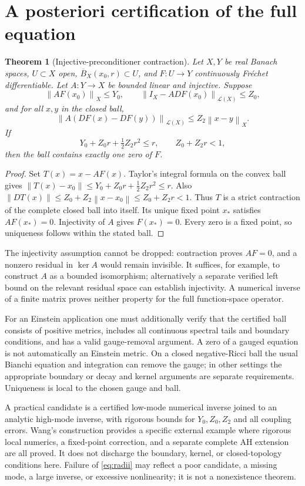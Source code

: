 \documentclass[a4paper,11pt]{article}
\newtheorem{theorem}{Theorem}[section]
\theoremstyle{definition}
\newcommand{\norm}[1]{\left\lVert#1\right\rVert}
\begin{document}
\section{A posteriori certification of the full equation}\label{sec:posteriori}
\begin{theorem}[Injective-preconditioner contraction]\label{thm:posteriori}
Let $X,Y$ be real Banach spaces, $U\subset X$ open,
$\overline B_X(x_0,r)\subset U$, and $F:U\to Y$ continuously
Fr\'echet differentiable. Let $A:Y\to X$ be bounded linear and
\emph{injective}. Suppose
\[
\norm{AF(x_0)}_X\le Y_0,\qquad
\norm{I_X-ADF(x_0)}_{\mathcal L(X)}\le Z_0,
\]
and for all $x,y$ in the closed ball,
\[
\norm{A(DF(x)-DF(y))}_{\mathcal L(X)}
                  \le Z_2\norm{x-y}_X .
\]
If
\begin{equation}\label{eq:radii}
Y_0+Z_0r+\tfrac12Z_2r^2\le r,\qquad Z_0+Z_2r<1,
\end{equation}
then the ball contains exactly one zero of $F$.
\end{theorem}
\begin{proof}
Set $T(x)=x-AF(x)$. Taylor's integral formula on the convex ball gives
$\norm{T(x)-x_0}\le Y_0+Z_0r+\frac12Z_2r^2\le r$.
Also
$\norm{DT(x)}\le Z_0+Z_2\norm{x-x_0}\le Z_0+Z_2r<1$.
Thus $T$ is a strict contraction of the complete closed ball into
itself. Its unique fixed point $x_*$ satisfies $AF(x_*)=0$.
Injectivity of $A$ gives $F(x_*)=0$. Every zero is a fixed point,
so uniqueness follows within the stated ball.
\end{proof}
The injectivity assumption cannot be dropped: contraction proves
$AF=0$, and a nonzero residual in $\ker A$ would remain invisible.
It suffices, for example, to construct $A$ as a bounded isomorphism;
alternatively a separate verified left bound on the relevant residual
space can establish injectivity. A numerical inverse of a finite
matrix proves neither property for the full function-space operator.

For an Einstein application one must additionally verify that the
certified ball consists of positive metrics, includes all continuous
spectral tails and boundary conditions, and has a valid gauge-removal
argument. A zero of a gauged equation is not automatically an Einstein
metric. On a closed negative-Ricci ball the usual Bianchi equation and
integration can remove the gauge; in other settings the appropriate
boundary or decay and kernel arguments are separate requirements.
Uniqueness is local to the chosen gauge and ball.

A practical candidate is a certified low-mode numerical inverse joined
to an analytic high-mode inverse, with rigorous bounds for
$Y_0,Z_0,Z_2$ and all coupling errors. Wang's construction
\cite{Wang} provides a specific external example where rigorous local
numerics, a fixed-point correction, and a separate complete AH
extension are all proved. It does not discharge the boundary, kernel,
or closed-topology conditions here. Failure of \eqref{eq:radii} may
reflect a poor candidate, a missing mode, a large inverse, or excessive
nonlinearity; it is not a nonexistence theorem.
\end{document}
